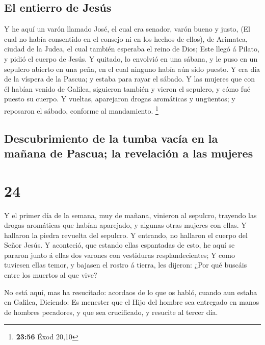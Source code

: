 \hypertarget{el-entierro-de-jesuxfas}{%
\subsection{El entierro de Jesús}\label{el-entierro-de-jesuxfas}}

 Y he aquí un varón llamado José, el cual era senador,
varón bueno y justo,  (El cual no había consentido en el
consejo ni en los hechos de ellos), de Arimatea, ciudad de la Judea, el
cual también esperaba el reino de Dios;  Este llegó á
Pilato, y pidió el cuerpo de Jesús.  Y quitado, lo envolvió
en una sábana, y le puso en un sepulcro abierto en una peña, en el cual
ninguno había aún sido puesto.  Y era día de la víspera de
la Pascua; y estaba para rayar el sábado.  Y las mujeres
que con él habían venido de Galilea, siguieron también y vieron el
sepulcro, y cómo fué puesto su cuerpo.  Y vueltas,
aparejaron drogas aromáticas y ungüentos; y reposaron el sábado,
conforme al mandamiento. \footnote{\textbf{23:56} Éxod 20,10}

\hypertarget{descubrimiento-de-la-tumba-vacuxeda-en-la-mauxf1ana-de-pascua-la-revelaciuxf3n-a-las-mujeres}{%
\subsection{Descubrimiento de la tumba vacía en la mañana de Pascua; la
revelación a las
mujeres}\label{descubrimiento-de-la-tumba-vacuxeda-en-la-mauxf1ana-de-pascua-la-revelaciuxf3n-a-las-mujeres}}

\hypertarget{section-23}{%
\section{24}\label{section-23}}

 Y el primer día de la semana, muy de mañana, vinieron al
sepulcro, trayendo las drogas aromáticas que habían aparejado, y algunas
otras mujeres con ellas.  Y hallaron la piedra revuelta del
sepulcro.  Y entrando, no hallaron el cuerpo del Señor
Jesús.  Y aconteció, que estando ellas espantadas de esto,
he aquí se pararon junto á ellas dos varones con vestiduras
resplandecientes;  Y como tuviesen ellas temor, y bajasen el
rostro á tierra, les dijeron: ¿Por qué buscáis entre los muertos al que
vive?

 No está aquí, mas ha resucitado: acordaos de lo que os
habló, cuando aun estaba en Galilea,  Diciendo: Es menester
que el Hijo del hombre sea entregado en manos de hombres pecadores, y
que sea crucificado, y resucite al tercer día.

